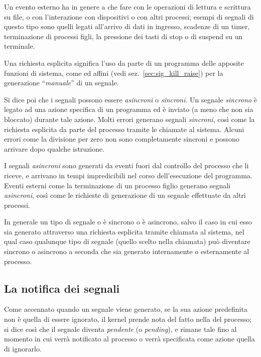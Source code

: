 Un evento esterno ha in genere a che fare con le operazioni di lettura e
scrittura su file, o con l'interazione con dispositivi o con altri processi;
esempi di segnali di questo tipo sono quelli legati all'arrivo di dati in
ingresso, scadenze di un timer, terminazione di processi figli, la pressione
dei tasti di stop o di suspend su un terminale.

Una richiesta esplicita significa l'uso da parte di un programma delle
apposite funzioni di sistema, come  ed affini (vedi
sez.~\ref{sec:sig_kill_raise}) per la generazione ``\textsl{manuale}'' di un
segnale.

Si dice poi che i segnali possono essere \textsl{asincroni} o
\textsl{sincroni}. Un segnale \textsl{sincrono} è legato ad una azione
specifica di un programma ed è inviato (a meno che non sia bloccato) durante
tale azione. Molti errori generano segnali \textsl{sincroni}, così come la
richiesta esplicita da parte del processo tramite le chiamate al sistema.
Alcuni errori come la divisione per zero non sono completamente sincroni e
possono arrivare dopo qualche istruzione.

I segnali \textsl{asincroni} sono generati da eventi fuori dal controllo del
processo che li riceve, e arrivano in tempi impredicibili nel corso
dell'esecuzione del programma. Eventi esterni come la terminazione di un
processo figlio generano segnali \textsl{asincroni}, così come le richieste di
generazione di un segnale effettuate da altri processi.

In generale un tipo di segnale o è sincrono o è asincrono, salvo il caso in
cui esso sia generato attraverso una richiesta esplicita tramite chiamata al
sistema, nel qual caso qualunque tipo di segnale (quello scelto nella
chiamata) può diventare sincrono o asincrono a seconda che sia generato
internamente o esternamente al processo.


\subsection{La notifica dei segnali}
\label{sec:sig_notification}

Come accennato quando un segnale viene generato, se la sua azione predefinita
non è quella di essere ignorato, il kernel prende nota del fatto nella
 del processo; si dice così che il segnale diventa
\textsl{pendente} (o \textit{pending}), e rimane tale fino al momento in cui
verrà notificato al processo o verrà specificata come azione quella di
ignorarlo.

